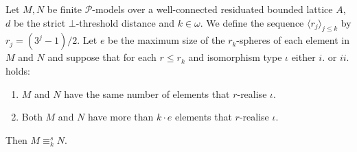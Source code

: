 \documentclass{lmcs} %
\newcommand{\?}{\ensuremath{\mkern0.4\thinmuskip}}
\newcommand{\CP}{\mathcal{P}}
\begin{document}
\begin{thm}\label{thm:Hanf}
    Let $M,N$ be finite $\CP$-models over a well-connected residuated bounded lattice $A$, $d$ be the strict $\bot$-threshold distance and $k\in\omega$. We define the sequence $\langle r_j\rangle_{j\leq k}$ by $r_j=(3^j-1)/2$. Let $e$ be the maximum size of the $r_k$-spheres of each element in $M$ and $N$ and suppose that for each $r\leq r_k$ and isomorphism type $\iota$ either $i.$ or $ii.$ holds:\begin{enumerate}[label=\roman*.]
        \item $M$ and $N$ have the same number of elements that $r$-realise $\iota$.
        \item Both $M$ and $N$ have more than $k\cdot e$ elements that $r$-realise $\iota$. 
    \end{enumerate}
    Then $M\equiv^s_k N$.
\end{thm}
\end{document}
